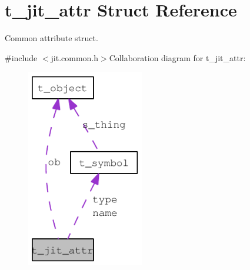\hypertarget{structt__jit__attr}{
\section{t\_\-jit\_\-attr Struct Reference}
\label{structt__jit__attr}
}


Common attribute struct.  


{\ttfamily \#include $<$jit.common.h$>$}Collaboration diagram for t\_\-jit\_\-attr:\nopagebreak
\begin{figure}[H]
\begin{center}
\leavevmode
\includegraphics[width=145pt]{structt__jit__attr__coll__graph}
\end{center}
\end{figure}
